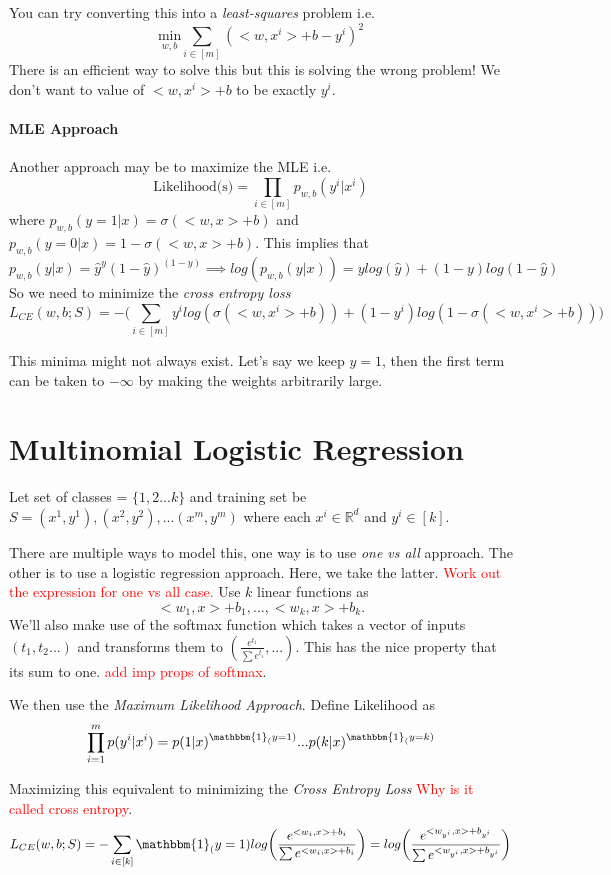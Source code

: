You can try converting this into a \textit{least-squares} problem i.e. 
\[
	\underset{w,b}{\text{min}} \sum_{i \in[m]}(<w,x^i> + b - y^i)^2
\]
There is an efficient way to solve this but this is solving the wrong problem! We don't want to value of $<w,x^i> + b$ to be exactly $y^i$.

\paragraph{MLE Approach} Another approach may be to maximize the MLE i.e. 
\[
	\text{Likelihood(s)} = \prod_{i \in [m]}p_{w,b}(y^i|x^i)
\]
where $p_{w,b}(y=1|x) = \sigma(<w,x> + b)$ and $p_{w,b}(y=0|x) = 1 - \sigma(<w,x> + b)$.
This implies that 
\[
	p_{w,b}(y|x) = \hat{y}^y(1-\hat{y})^{(1-y)} \implies log(p_{w,b}(y|x)) = ylog(\hat{y}) + {(1-y)}log(1-\hat{y})
\]
So we need to minimize the \textit{cross entropy loss}
\[
	L_{CE}(w,b;S) = -\bigg(\sum_{i \in [m]}y^ilog(\sigma(<w,x^i> + b)) + (1 - y^i)log(1 - \sigma(<w,x^i> + b))\bigg)
\]

This minima might not always exist. Let's say we keep $y = 1$, then the first term can be taken to $-\infty$ by making the weights arbitrarily large.


\section{Multinomial Logistic Regression}
Let set of classes = $\{1,2...k\}$ and training set be $S = {(x^1, y^1), (x^2, y^2), ... (x^m, y^m)}$ where each $x^i \in \mathbb{R}^d$ and $y^i \in [k]$. 

There are multiple ways to model this, one way is to use \textit{one vs all} approach. The other is to use a logistic regression approach. Here, we take the latter. \textcolor{red}{Work out the expression for one vs all case.} Use $k$ linear functions as 
\[
	<w_1,x> + b_1, ..., <w_k, x> + b_k.
\]
We'll also make use of the softmax function which takes a vector of inputs $(t_1, t_2...)$ and transforms them to $(\frac{e^{t_1}}{\sum e^{t_i}}, ... )$. This has the nice property that its sum to one. \textcolor{red}{add imp props of softmax}.

We then use the \textit{Maximum Likelihood Approach}. Define Likelihood as
\[
	\prod_{i=1}^{m}p(y^i|x^i) = p(1|x)^{\mathbbm{1}_(y=1)}...p(k|x)^{\mathbbm{1}_(y=k)}
\]

Maximizing this equivalent to minimizing the \textit{Cross Entropy Loss} \textcolor{red}{Why is it called cross entropy}.
\[
	L_{CE}(w,b;S) = -\sum_{i\in[k]}\mathbbm{1}_(y=1)log\bigg(\frac{e^{<w_i,x>+b_i}}{\sum e^{<w_i,x>+b_i}}\bigg) = log\bigg( \frac{e^{<w_{y^i},x>+b_{y^i}}}{\sum e^{<w_{y^i},x>+b_{y^i}}} \bigg)
\]


